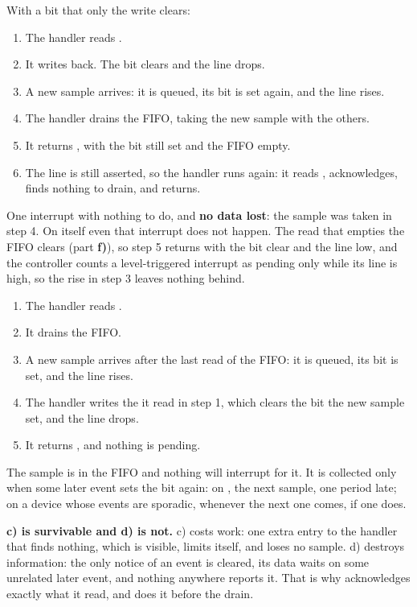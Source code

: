  With a bit that only the write clears:
\begin{enumerate}
  \item The handler reads .
  \item It writes  back. The bit clears and the line drops.
  \item A new sample arrives: it is queued, its bit is set again, and the line rises.
  \item The handler drains the FIFO, taking the new sample with the others.
  \item It returns , with the bit still set and the FIFO empty.
  \item The line is still asserted, so the handler runs again: it reads , acknowledges,
    finds nothing to drain, and returns.
\end{enumerate}
One interrupt with nothing to do, and \textbf{no data lost}: the sample was taken in step 4. On
 itself even that interrupt does not happen. The read that empties the FIFO clears
 (part \textbf{f)}), so step 5 returns with the bit clear and the line low, and the
controller counts a level-triggered interrupt as pending only while its line is high, so the rise
in step 3 leaves nothing behind.

\begin{enumerate}
  \item The handler reads .
  \item It drains the FIFO.
  \item A new sample arrives after the last read of the FIFO: it is queued, its bit is set, and the
    line rises.
  \item The handler writes the  it read in step 1, which clears the bit the new sample
    set, and the line drops.
  \item It returns , and nothing is pending.
\end{enumerate}
The sample is in the FIFO and nothing will interrupt for it. It is collected only when some later
event sets the bit again: on , the next sample, one period late; on a device whose
events are sporadic, whenever the next one comes, if one does.

 \textbf{c) is survivable and d) is not.} c) costs work: one extra entry to the handler
that finds nothing, which is visible, limits itself, and loses no sample. d) destroys information:
the only notice of an event is cleared, its data waits on some unrelated later event, and nothing
anywhere reports it. That is why  acknowledges exactly what it read, and does it
before the drain.


